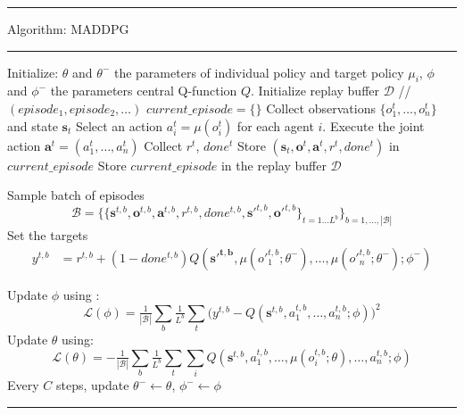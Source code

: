\documentclass[varwidth, border=20pt]{standalone}
\begin{document}
\begingroup
\small                    
\begin{center}
  \begin{minipage}{0.99\linewidth} 
    \hrule height 0.7pt
    \vspace{3pt}
    Algorithm: MADDPG
    \vspace{3pt}
    \hrule height 0.7pt
    \vspace{6pt}

   
    \begin{algorithmic}[1]
      \State Initialize: $\theta$ and  $\theta^-$ the parameters of individual policy and target policy $\mu_i$, $\phi$ and $\phi^-$ the parameters central Q-function $Q$.
      \State Initialize replay buffer $\mathcal{D}$ // $(episode_1, episode_2, \dots)$
        \State $current\_episode = \{ \}$ 
        \State Collect observations $\{o^t_1,\dots,o^t_n\}$ and state $\mathbf{s}_t$
        \State Select an action $a^t_i = \mu(o^t_i)$ for each agent $i$. 
         \State Execute the joint action $\mathbf{a}^t = (a_1^t,\dots,a_n^t)$
         \State Collect $r^t$, $done^t$
         \State Store $(\mathbf{s}_t,\mathbf{o}^t,\mathbf{a}^t,r^t,done^t)$ in $current\_episode$
        \EndWhile
        \State Store $current\_episode$ in the replay buffer $\mathcal{D}$
        
          \State Sample batch of episodes 
          \[ 
            \mathcal{B} = \{ \{\mathbf{s}^{t,b},\mathbf{o}^{t,b},\mathbf{a}^{t,b},r^{t,b},done^{t,b},\mathbf{s'}^{t,b},\mathbf{o'}^{t,b}\}_{t=1 ... L^b}\}_{b=1, ..., |\mathcal{B}|}\]
          \State Set the targets 
          \Statex
          \begin{align*}
            y^{t,b} &= r^{t,b} +  (1 - done^{t,b}) Q(\mathbf{s'^{t,b}},\mu(o'^{t,b}_1;\theta^-), \dots , \mu(o'^{t,b}_n;\theta^-); \phi^-) 
            \end{align*}
            
          \State Update $\phi$ using :
          \Statex
          \[
            \mathcal{L}(\phi)=\tfrac{1}{|\mathcal{B}|}\sum_b \tfrac{1}{L^b} \sum_t \Big(y^{t,b}- Q(\mathbf{s}^{t,b},a^{t,b}_1, \dots , a^{t,b}_n; \phi)\Big)^2
          \]
          \State Update $\theta$ using: 
          \[
            \mathcal{L}(\theta) = - \tfrac{1}{|\mathcal{B}|}\sum_b \tfrac{1}{L^b} \sum_t \sum_i Q(\mathbf{s}^{t,b},a^{t,b}_1, \dots, \mu(o^{t,b}_i;\theta), \dots , a^{t,b}_n;\phi)
          \]
          \State Every $C$ steps, update $\theta^- \leftarrow \theta$, $\phi^- \leftarrow \phi$ 
        \EndIf
      \EndWhile
    \end{algorithmic}

    \vspace{6pt}
    \hrule height 0.7pt
  \end{minipage}
\end{center}
\endgroup
\end{document}
